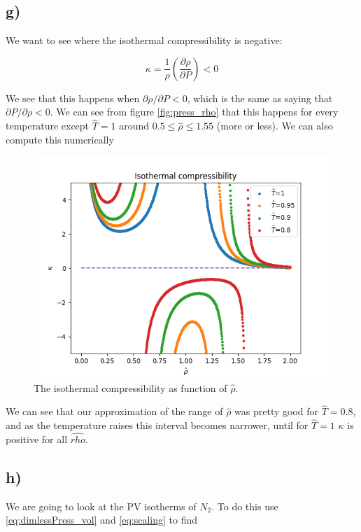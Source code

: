 \documentclass[a4paper,norsk, 10pt]{article}
\newcommand{\pd}[2]{\frac{\partial #1}{\partial #2}}
\begin{document}
\subsection{g)}

We want to see where the isothermal compressibility is negative:

\begin{equation}
\kappa = \frac{1}{\rho}\left(\pd{\rho}{P}\right) < 0
\end{equation}

We see that this happens when $\partial \rho/\partial P < 0$, which is the same as saying that $\partial P/\partial \rho < 0$. We can see from figure \ref{fig:press_rho} that this happens for every temperature except $\hat{T} = 1$ around $0.5 \leq \hat{\rho} \leq 1.55$ (more or less). We can also compute this numerically

\begin{figure}[H]
\centering
\includegraphics[scale=0.5]{isoComp.png}
\caption{The isothermal compressibility as function of $\hat{\rho}$.}
\label{fig:isoComp}
\end{figure}

We can see that our approximation of the range of $\hat{\rho}$ was pretty good for $\hat{T} = 0.8$, and as the temperature raises this interval becomes narrower, until for $\hat{T} = 1$ $\kappa$ is positive for all $\hat{rho}$.


\subsection{h)}
We are going to look at the PV isotherms of $N_2$. To do this use \eqref{eq:dimlessPress_vol} and \eqref{eq:scaling} to find
\end{document}
